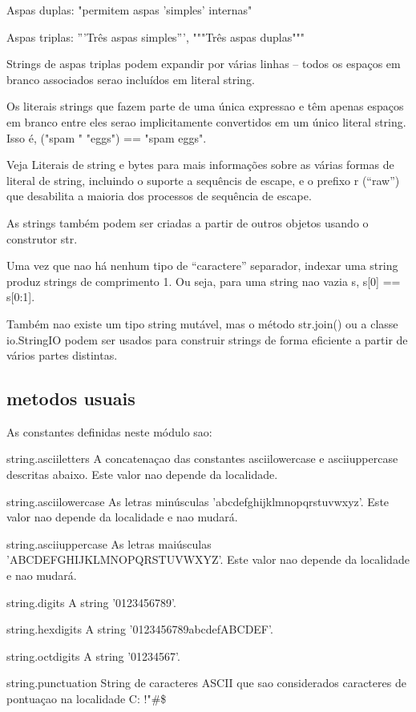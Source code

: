 \documentclass{article}
\begin{document}
Aspas duplas: "permitem aspas 'simples' internas"

Aspas triplas: '''Três aspas simples''', """Três aspas duplas"""

Strings de aspas triplas podem expandir por várias linhas – todos os espaços em branco associados serao incluídos em literal string.

Os literais strings que fazem parte de uma única expressao e têm apenas espaços em branco entre eles serao implicitamente convertidos em um único literal string. Isso é, ("spam " "eggs") == "spam eggs".

Veja Literais de string e bytes para mais informações sobre as várias formas de literal de string, incluindo o suporte a sequêncis de escape, e o prefixo r (“raw”) que desabilita a maioria dos processos de sequência de escape.

As strings também podem ser criadas a partir de outros objetos usando o construtor str.

Uma vez que nao há nenhum tipo de “caractere” separador, indexar uma string produz strings de comprimento 1. Ou seja, para uma string nao vazia s, s[0] == s[0:1].

Também nao existe um tipo string mutável, mas o método str.join() ou a classe io.StringIO podem ser usados para construir strings de forma eficiente a partir de vários partes distintas.
\subsection{metodos usuais}
As constantes definidas neste módulo sao:

string.asciiletters
A concatenaçao das constantes asciilowercase e asciiuppercase descritas abaixo. Este valor nao depende da localidade.

string.asciilowercase
As letras minúsculas 'abcdefghijklmnopqrstuvwxyz'. Este valor nao depende da localidade e nao mudará.

string.asciiuppercase
As letras maiúsculas 'ABCDEFGHIJKLMNOPQRSTUVWXYZ'. Este valor nao depende da localidade e nao mudará.

string.digits
A string '0123456789'.

string.hexdigits
A string '0123456789abcdefABCDEF'.

string.octdigits
A string '01234567'.

string.punctuation
String de caracteres ASCII que sao considerados caracteres de pontuaçao na localidade C: !"\#\$%
\end{document}
